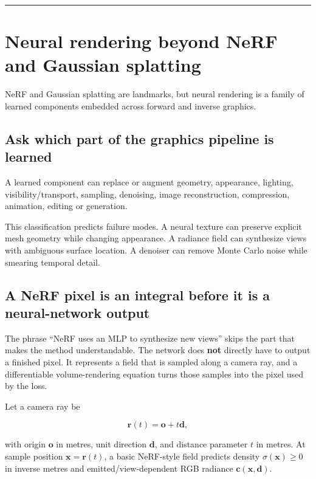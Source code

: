 \begin{center}\rule{0.5\linewidth}{0.5pt}\end{center}

\section{Neural rendering beyond NeRF and Gaussian splatting}\label{04-visual-computing-ii-ch035-neural-rendering-beyond-nerf-and-gaussian-splatting}

NeRF and Gaussian splatting are landmarks, but neural rendering is a family of learned components embedded across forward and inverse graphics.

\subsection{Ask which part of the graphics pipeline is learned}\label{04-visual-computing-ii-ch035-ask-which-part-of-the-graphics-pipeline-is-learned}

A learned component can replace or augment geometry, appearance, lighting, visibility/transport, sampling, denoising, image reconstruction, compression, animation, editing or generation.

This classification predicts failure modes. A neural texture can preserve explicit mesh geometry while changing appearance. A radiance field can synthesize views with ambiguous surface location. A denoiser can remove Monte Carlo noise while smearing temporal detail.

\subsection{A NeRF pixel is an integral before it is a neural-network output}\label{04-visual-computing-ii-ch035-a-nerf-pixel-is-an-integral-before-it-is-a-neural-network-output}

The phrase ``NeRF uses an MLP to synthesize new views'' skips the part that makes the method understandable. The network does \textbf{not} directly have to output a finished pixel. It represents a field that is sampled along a camera ray, and a differentiable volume-rendering equation turns those samples into the pixel used by the loss.

Let a camera ray be

\[\mathbf r(t)=\mathbf o+t\mathbf d,\]

with origin \(\mathbf o\) in metres, unit direction \(\mathbf d\), and distance parameter \(t\) in metres. At sample position \(\mathbf x=\mathbf r(t)\), a basic NeRF-style field predicts density \(\sigma(\mathbf x)\ge0\) in inverse metres and emitted/view-dependent RGB radiance \(\mathbf c(\mathbf x,\mathbf d)\).

